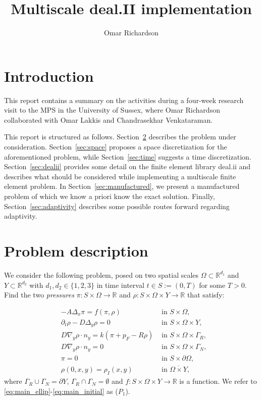 \documentclass{article}
\title{Multiscale deal.II implementation}
\author{Omar Richardson}
\newcommand{\R}{\mathbb{ R}}
\begin{document}
\maketitle

\section{Introduction}
This report contains a summary on the activities during a four-week research visit to the MPS in the University of Sussex, where Omar Richardson collaborated with Omar Lakkis and Chandrasekhar Venkataraman.

This report is structured as follows. Section~\ref{sec:problem} describes the problem under consideration. Section~\ref{sec:space} proposes a space discretization for the aforementioned problem, while Section~\ref{sec:time} suggests a time discretization. Section~\ref{sec:dealii} provides some detail on the finite element library deal.ii and describes what should be considered while implementing a multiscale finite element problem. In Section~\ref{sec:manufactured}, we present a manufactured problem of which we know a priori know the exact solution.
Finally, Section~\ref{sec:adaptivity} describes some possible routes forward regarding adaptivity.

\section{Problem description}
\label{sec:problem}

We consider the following problem, posed on two spatial scales $\Omega\subset \R^{d_1}$ and $Y \subset \R^{d_2}$ with $d_1,d_2 \in \{1,2,3\}$ in time interval $t\in S := (0,T)$ for some $T>0$. Find the two \emph{pressures} $\pi: S\times\Omega \to \R $ and $\rho: S\times\Omega\times Y\to \R$ that satisfy:

\begin{align}
    \label{eq:main_ellip}&-A\Delta_x\pi=f(\pi,\rho)  &\mbox{ in }S\times\Omega,\\
    \label{eq:main_para}&\partial_t\rho-D\Delta_y\rho = 0  &\mbox{ in }S\times\Omega\times Y,\\
    \label{eq:main_robin}&D\nabla_y\rho\cdot n_y= k(\pi+p_F-R\rho)&\mbox{ in } S\times\Omega\times\Gamma_R,\\
    \label{eq:main_neumann}&D\nabla_y\rho\cdot n_y=0&\mbox{ in }S\times\Omega\times\Gamma_N,\\
    \label{eq:main_dirichlet}&\pi=0 &\mbox{ in }S\times\partial\Omega,\\
    \label{eq:main_initial}&\rho(0,x,y)=\rho_I(x,y)&\mbox{ in } \overline{\Omega\times Y},
\end{align}
where $\Gamma_R \cup \Gamma_N = \partial Y$, $\Gamma_R \cap \Gamma_N = \emptyset$ and $f:S\times\Omega\times Y \to \R$ is a function. We refer to \eqref{eq:main_ellip}-\eqref{eq:main_initial} as ($P_1$).
\end{document}
